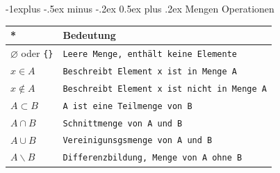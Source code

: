 \documentclass[a4paper,10pt]{article}
\makeatletter
\renewcommand{\subsection}{\@startsection{subsection}{2}{0mm}%
                                {-1explus -.5ex minus -.2ex}%
                                {0.5ex plus .2ex}%
                                {\normalfont\normalsize\bfseries}}
\makeatother
\begin{document}
\begin{multicols}{3}
    \subsection{Mengen Operationen}
    \begin{tabular}{l|l}
        \textbf{*}                   & \textbf{Bedeutung}                               \\ \hline
        $\varnothing$ oder \verb!{}! & \verb!Leere Menge, enthält keine Elemente!       \\ \hline
        $x\in A$                     & \verb!Beschreibt Element x ist in Menge A!       \\ \hline
        $x\notin A$                  & \verb!Beschreibt Element x ist nicht in Menge A! \\ \hline
        $A\subset B$                 & \verb!A ist eine Teilmenge von B!                \\ \hline
        $A\cap B$                    & \verb!Schnittmenge von A und B!                  \\ \hline
        $A\cup B$                    & \verb!Vereinigunsgsmenge von A und B!            \\ \hline
        $A\backslash B$              & \verb!Differenzbildung, Menge von A ohne B!      \\
    \end{tabular}
    \def\firstcircle{(0,0) circle (1cm)}
    \def\secondcircle{(0:1.2cm) circle (1cm)}



    \setlength{\parskip}{5mm}


\end{multicols}
\end{document}
